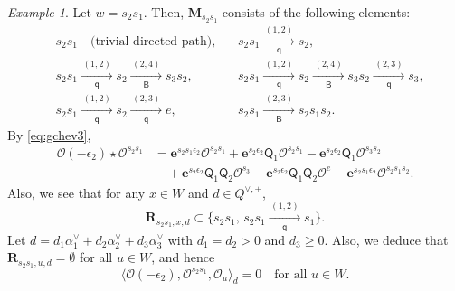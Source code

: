 \documentclass[11pt,a4paper,reqno,dvipdfmx]{amsart}
\numberwithin{equation}{section}
\newcommand{\CO}{\mathcal{O}}
\newcommand{\sQ}{\mathsf{Q}}
\newcommand{\eps}{\epsilon}
\newcommand{\be}{\mathbf{e}}
\newcommand{\bM}{\mathbf{M}}
\newcommand{\Qe}[1]{ \xrightarrow[\mathsf{q}]{\hspace{2pt}#1\hspace{2pt}} }
\newcommand{\Be}[1]{ \xrightarrow[\mathsf{B}]{\hspace{2pt}#1\hspace{2pt}} }
\newcommand{\bfR}{\mathbf{R}}
\theoremstyle{plain}
\theoremstyle{definition}
\theoremstyle{remark}
\newtheorem{ex}[lem]{Example}
\begin{document}
\begin{ex} \label{ex:a3-3}
Let $w = s_{2}s_{1}$. Then, $\bM_{s_{2}s_{1}}$ consists of the following elements:
%
\begin{align*}
& s_{2}s_{1} \quad \text{(trivial directed path)}, & 
& s_{2}s_{1} \Qe{(1,2)} s_{2}, \\
& s_{2}s_{1} \Qe{(1,2)} s_{2} \Be{(2,4)} s_{3}s_{2}, &
& s_{2}s_{1} \Qe{(1,2)} s_{2} \Be{(2,4)} s_{3}s_{2} \Qe{(2,3)} s_{3}, \\
& s_{2}s_{1} \Qe{(1,2)} s_{2} \Qe{(2,3)} e, & 
& s_{2}s_{1} \Be{(2,3)} s_{2}s_{1}s_{2}. 
\end{align*}
%
By \eqref{eq:gchev3}, 
%
\begin{align*}
\CO(- \eps_{2}) \star \CO^{s_{2}s_{1}} & = 
\be^{s_{2} s_{1} \eps_{2} } \CO^{s_{2} s_{1}} + 
\be^{s_{2} \eps_{2} } \sQ_{1} \CO^{s_{2} s_{1}} -  
\be^{s_{2} \eps_{2} } \sQ_{1} \CO^{s_{3} s_{2}} \\
& \quad + \be^{s_{2} \eps_{2} } \sQ_{1}\sQ_{2} \CO^{s_{3}} - 
\be^{s_{2} \eps_{2} } \sQ_{1}\sQ_{2} \CO^{e} -  
\be^{s_{2} s_{1} \eps_{2} } \CO^{s_{2} s_{1}s_{2}}. 
%
\end{align*}
%
Also, we see that for any $x \in W$ and $d \in Q^{\vee,+}$, 
%
\begin{equation*}
\bfR_{s_{2}s_{1},x,d} \subset \bigl\{ s_{2}s_{1}, \, s_{2} s_{1} \Qe{(1,2)} s_{1} \bigr\}.
\end{equation*}
%
Let $d=d_{1}\alpha_{1}^{\vee} + d_{2}\alpha_{2}^{\vee} + d_{3}\alpha_{3}^{\vee}$ with 
$d_{1} = d_{2} > 0$ and $d_{3} \ge 0$. Also, we deduce that 
$\bfR_{s_{2}s_{1},u,d} = \emptyset$ for all $u \in W$, and hence 
%
\begin{equation*}
\langle \CO(- \eps_{2}),\CO^{s_{2}s_{1}},\CO_{u} \rangle_{d} = 0 \quad 
\text{for all $u \in W$}. 
\end{equation*}
%
\end{ex}
%
\fi
%
%
\end{document}
